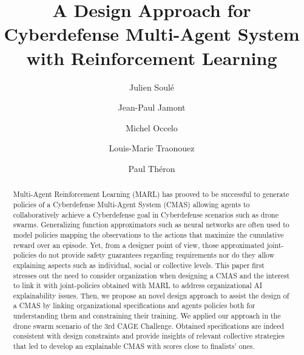 \documentclass[runningheads]{llncs}
\begin{document}
%
\title{A Design Approach for Cyberdefense Multi-Agent System with Reinforcement Learning}
%
%
\author{Julien Soulé \and
  Jean-Paul Jamont \and
  Michel Occelo \and
  Louis-Marie Traonouez \and
  Paul Théron}
%
%


\maketitle              %



\begin{abstract}

  Multi-Agent Reinforcement Learning (MARL) has prooved to be successful to generate policies of a Cyberdefense Multi-Agent System (CMAS) allowing agents to collaboratively achieve a Cyberdefense goal in Cyberdefense scenarios such as drone swarms. Generalizing function approximators such as neural networks are often used to model policies mapping the observations to the actions that maximize the cumulative reward over an episode.
  Yet, from a designer point of view, those approximated joint-policies do not provide safety guarantees regarding requirements nor do they allow explaining aspects such as individual, social or collective levels.
  This paper first stresses out the need to consider organization when designing a CMAS and the interest to link it with joint-policies obtained with MARL to address organizational AI explainability issues. Then, we propose an novel design approach to assist the design of a CMAS by linking organizational specifications and agents policies both for understanding them and constraining their training.
  We applied our approach in the drone swarm scenario of the 3rd CAGE Challenge. Obtained specifications are indeed consistent with design constraints and provide insights of relevant collective strategies that led to develop an explainable CMAS with scores close to finalists' ones.

\end{abstract}
\end{document}
